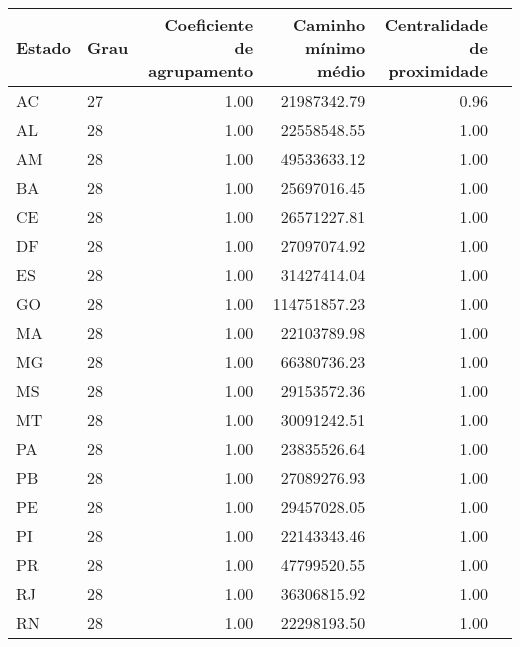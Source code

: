\centering
\begin{tabular}{llrrrr}
\toprule
Estado &  Grau &  \shortstack{Coeficiente\\de agrupamento} &  \shortstack{Caminho\\mínimo médio} &  \shortstack{Centralidade\\de proximidade} \\
\midrule
AC &      27 &        1.00 &            21987342.79 &                  0.96 \\
AL &      28 &        1.00 &            22558548.55 &                  1.00 \\
AM &      28 &        1.00 &            49533633.12 &                  1.00 \\
BA &      28 &        1.00 &            25697016.45 &                  1.00 \\
CE &      28 &        1.00 &            26571227.81 &                  1.00 \\
DF &      28 &        1.00 &            27097074.92 &                  1.00 \\
ES &      28 &        1.00 &            31427414.04 &                  1.00 \\
GO &      28 &        1.00 &           114751857.23 &                  1.00 \\
MA &      28 &        1.00 &            22103789.98 &                  1.00 \\
MG &      28 &        1.00 &            66380736.23 &                  1.00 \\
MS &      28 &        1.00 &            29153572.36 &                  1.00 \\
MT &      28 &        1.00 &            30091242.51 &                  1.00 \\
PA &      28 &        1.00 &            23835526.64 &                  1.00 \\
PB &      28 &        1.00 &            27089276.93 &                  1.00 \\
PE &      28 &        1.00 &            29457028.05 &                  1.00 \\
PI &      28 &        1.00 &            22143343.46 &                  1.00 \\
PR &      28 &        1.00 &            47799520.55 &                  1.00 \\
RJ &      28 &        1.00 &            36306815.92 &                  1.00 \\
RN &      28 &        1.00 &            22298193.50 &                  1.00 \\

\end{tabular}
